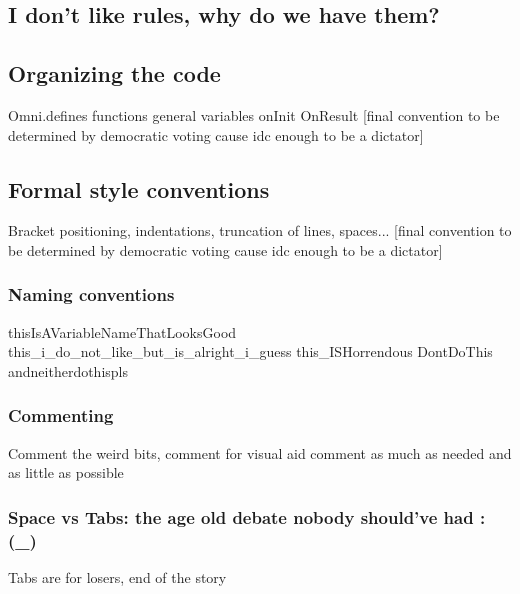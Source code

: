 \subsection{I don't like rules, why do we have them?}

\subsection{Organizing the code}
Omni.defines
functions
general variables
onInit
OnResult
[final convention to be determined by democratic voting cause idc enough to be a dictator]
\subsection{Formal style conventions}
Bracket positioning, indentations, truncation of lines, spaces...
[final convention to be determined by democratic voting cause idc enough to be a dictator]
\subsubsection{Naming conventions}
thisIsAVariableNameThatLooksGood\newline
this\_i\_do\_not\_like\_but\_is\_alright\_i\_guess\newline
this\_ISHorrendous\newline
DontDoThis\newline
andneitherdothispls\newline
\subsubsection{Commenting}
Comment the weird bits, comment for visual aid
comment as much as needed and as little as possible
\subsubsection{Space vs Tabs: the age old debate nobody should've had :(\_)}
Tabs are for losers, end of the story

